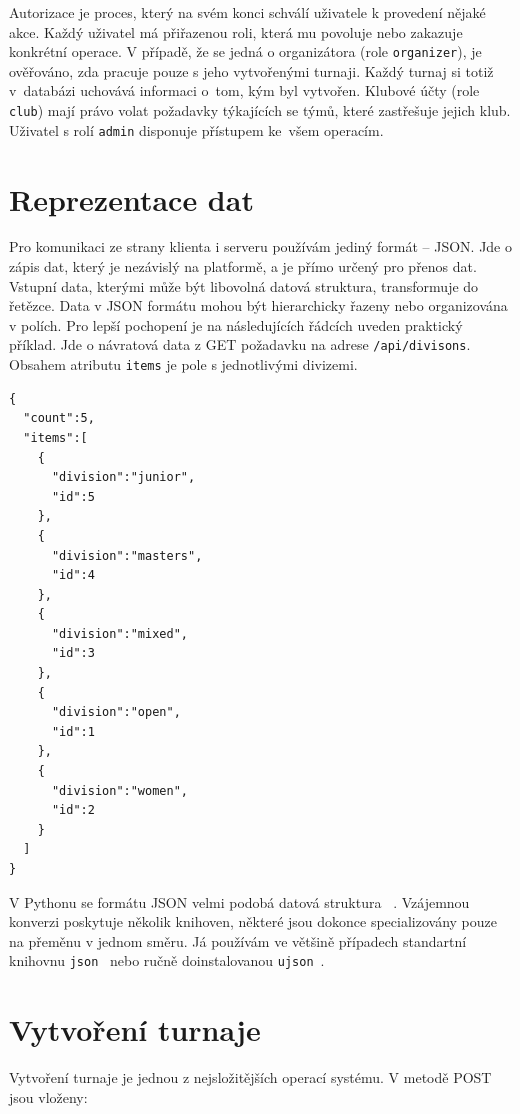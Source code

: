Autorizace je proces, který na svém konci schválí uživatele k provedení nějaké akce. Každý uživatel
má přiřazenou roli, která mu povoluje nebo zakazuje konkrétní operace. V případě, že
se jedná o organizátora (role \texttt{organizer}), je ověřováno, zda pracuje pouze s jeho vytvořenými turnaji.
Každý turnaj si totiž v~databázi uchovává informaci o~tom, kým byl vytvořen. Klubové účty
(role \texttt{club}) mají právo volat požadavky týkajících se týmů, které zastřešuje jejich klub.
Uživatel s rolí \texttt{admin} disponuje přístupem ke~všem operacím.

\section{Reprezentace dat}

Pro komunikaci ze strany klienta i serveru používám jediný formát -- JSON.
Jde o zápis dat, který je nezávislý na platformě, a je přímo určený pro přenos dat.
Vstupní data, kterými může být libovolná datová struktura, transformuje do řetězce.
Data v JSON formátu mohou být hierarchicky řazeny nebo organizována v polích.
Pro lepší pochopení je na následujících řádcích uveden praktický příklad.
Jde o návratová data z GET požadavku na adrese \texttt{/api/divisons}.
Obsahem atributu \texttt{items} je pole s jednotlivými divizemi.

\begingroup
\fontsize{9.5pt}{11pt}\selectfont
\begin{lstlisting}[basicstyle=\small,style=json]
 {
  "count":5,
  "items":[
    {
      "division":"junior",
      "id":5
    },
    {
      "division":"masters",
      "id":4
    },
    {
      "division":"mixed",
      "id":3
    },
    {
      "division":"open",
      "id":1
    },
    {
      "division":"women",
      "id":2
    }
  ]
}
\end{lstlisting}
\endgroup

V Pythonu se formátu JSON velmi podobá datová struktura ~\cite{python_dict}.
Vzájemnou konverzi poskytuje několik knihoven, některé jsou dokonce specializovány pouze na přeměnu v jednom směru.
Já používám ve většině případech standartní knihovnu \texttt{json}~\cite{python_json}
nebo ručně doinstalovanou \texttt{ujson}~\cite{python_ujson}.

\section{Vytvoření turnaje}

Vytvoření turnaje je jednou z nejsložitějších operací systému. V metodě POST jsou vloženy:

